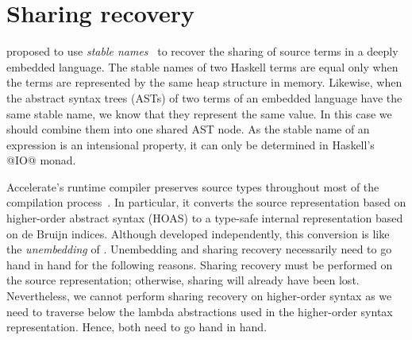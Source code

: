 \section{Sharing recovery} %
\label{sec:sharing}

%
%
%

\citet{Gill:2009dx} proposed to use \emph{stable names}~\cite{PeytonJones:StorageManager} to recover the sharing of source terms in a deeply embedded language. The stable names of two Haskell terms are equal only when the terms are represented by the same heap structure in memory. Likewise, when the abstract syntax trees (ASTs) of two terms of an embedded language have the same stable name, we know that they represent the same value. In this case we should combine them into one shared AST node. As the stable name of an expression is an intensional property, it can only be determined in Haskell's @IO@ monad.

Accelerate's runtime compiler preserves source types throughout most of the compilation process~\cite{Chakravarty:Accelerate}. In particular, it converts the source representation based on higher-order abstract syntax (HOAS) to a type-safe internal representation based on de Bruijn indices. Although developed independently, this conversion is like the \emph{unembedding} of \citet{Atkey:Unembedding}. Unembedding and sharing recovery necessarily need to go hand in hand for the following reasons. Sharing recovery must be performed on the source representation; otherwise, sharing will already have been lost. Nevertheless, we cannot perform sharing recovery on higher-order syntax as we need to traverse below the lambda abstractions used in the higher-order syntax representation. Hence, both need to go hand in hand.

